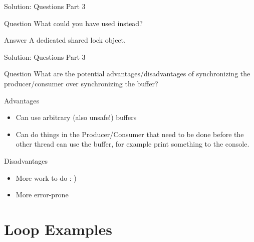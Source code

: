 \begin{frame}{Solution: Questions Part 3}
  \begin{block}{Question}
    What could you have used instead?
  \end{block}


  \pause

  \begin{exampleblock}{Answer}
    A dedicated shared lock object.
  \end{exampleblock}
\end{frame}

\begin{frame}{Solution: Questions Part 3}
  \begin{block}{Question}
    What are the potential advantages/disadvantages of synchronizing
    the producer/consumer over synchronizing the buffer?
  \end{block}


  \pause

  \begin{exampleblock}{Advantages}
    \begin{itemize}
    \item Can use arbitrary (also unsafe!) buffers
    \item Can do things in the Producer/Consumer that need to be done
      before the other thread can use the buffer, for example print
      something to the console.
    \end{itemize}
  \end{exampleblock}


  \pause

  \begin{alertblock}{Disadvantages}
    \begin{itemize}
    \item More work to do :-)
    \item More error-prone
    \end{itemize}
  \end{alertblock}
\end{frame}


\section{Loop Examples}

